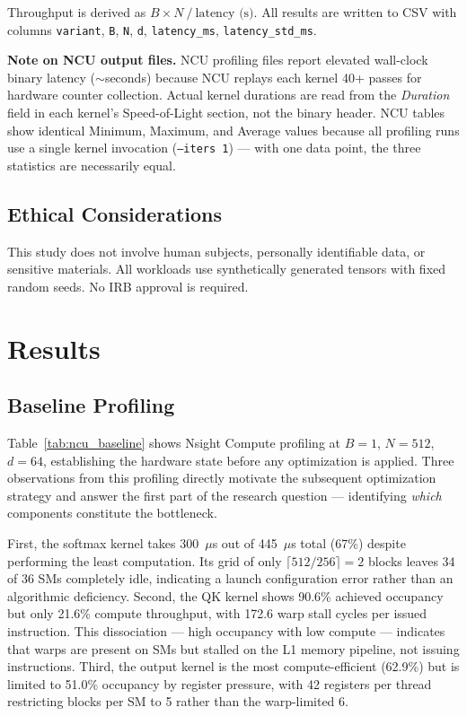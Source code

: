 \documentclass{article}
\begin{document}
Throughput is derived as $B \times N\ /\ \text{latency (s)}$. All results
are written to CSV with columns \texttt{variant}, \texttt{B}, \texttt{N},
\texttt{d}, \texttt{latency\_ms}, \texttt{latency\_std\_ms}.

\textbf{Note on NCU output files.} NCU profiling files report elevated
wall-clock binary latency ($\sim$seconds) because NCU replays each kernel
40+ passes for hardware counter collection. Actual kernel durations are
read from the \textit{Duration} field in each kernel's Speed-of-Light
section, not the binary header. NCU tables show identical Minimum, Maximum,
and Average values because all profiling runs use a single kernel invocation
(\texttt{--iters 1}) — with one data point, the three statistics are
necessarily equal.

\subsection{Ethical Considerations}

This study does not involve human subjects, personally identifiable data, or
sensitive materials. All workloads use synthetically generated tensors with
fixed random seeds. No IRB approval is required.

\section{Results}
\label{sec:results}

\subsection{Baseline Profiling}

Table~\ref{tab:ncu_baseline} shows Nsight Compute profiling at
$B{=}1$, $N{=}512$, $d{=}64$, establishing the hardware state before any
optimization is applied. Three observations from this profiling directly
motivate the subsequent optimization strategy and answer the first part of
the research question — identifying \textit{which} components constitute the
bottleneck.

First, the softmax kernel takes 300~$\mu$s out of 445~$\mu$s total (67\%)
despite performing the least computation. Its grid of only
$\lceil 512/256\rceil = 2$ blocks leaves 34 of 36 SMs completely idle,
indicating a launch configuration error rather than an algorithmic deficiency.
Second, the QK kernel shows 90.6\% achieved occupancy but only 21.6\%
compute throughput, with 172.6 warp stall cycles per issued instruction.
This dissociation — high occupancy with low compute — indicates that warps
are present on SMs but stalled on the L1 memory pipeline, not issuing
instructions. Third, the output kernel is the most compute-efficient (62.9\%)
but is limited to 51.0\% occupancy by register pressure, with 42 registers
per thread restricting blocks per SM to 5 rather than the warp-limited 6.
\end{document}
